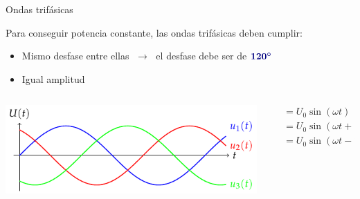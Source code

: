 \documentclass[aspectratio=169, usenames,svgnames,dvipsnames]{beamer}
\begin{document}
\begin{frame}{Ondas trifásicas}
    \vspace{3mm}

    Para conseguir potencia constante, las ondas trifásicas deben cumplir:

    \vspace{1mm}
    \begin{itemize}
        \item Mismo \alert{desfase entre ellas} $\; \rightarrow \;$ el desfase debe ser de ${\boldsymbol{\color{blue!50!black} 120^\circ}}$

        \vspace{2mm}
        \item Igual \alert{amplitud}
    \end{itemize}

    \vspace{5mm}
    \begin{columns}
    \begin{column}{0.67\columnwidth}
        \hspace*{4mm}
        \includegraphics[width=1.05\linewidth]{../figs/TensionesTrifasica.pdf}
    \end{column}    
    \begin{column}{0.33\columnwidth}
        \vspace{-0.1mm}
        \begin{align*}
          &= U_0 \sin(\omega t)\\[7pt]
          &= U_0 \sin(\omega t + 2\pi/3)\\[10.8mm]
          &= U_0 \sin(\omega t - 2\pi/3)
        \end{align*}
    \end{column}
    \end{columns}
\end{frame}

\end{document}
